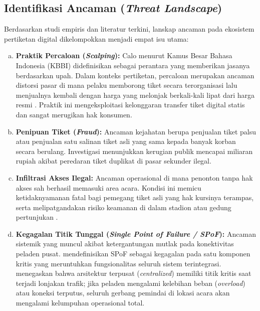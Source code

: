 \subsection{Identifikasi Ancaman (\textit{Threat Landscape})}
Berdasarkan studi empiris dan literatur terkini, lanskap ancaman pada ekosistem pertiketan digital dikelompokkan menjadi empat isu utama:

\begin{enumerate}[a)]
    \item \textbf{Praktik Percaloan (\textit{Scalping}): }
    Calo menurut Kamus Besar Bahasa Indonesia (KBBI) didefinisikan sebagai perantara yang memberikan jasanya berdasarkan upah. Dalam konteks pertiketan, percaloan merupakan ancaman distorsi pasar di mana pelaku memborong tiket secara terorganisasi lalu menjualnya kembali dengan harga yang melonjak berkali-kali lipat dari harga resmi \cite{Pamela2023}. Praktik ini mengeksploitasi kelonggaran transfer tiket digital statis dan sangat merugikan hak konsumen.
        
    \item \textbf{Penipuan Tiket (\textit{Fraud}): }
    Ancaman kejahatan berupa penjualan tiket palsu atau penjualan satu salinan tiket asli yang sama kepada banyak korban secara berulang. Investigasi \textcite{diveranta2025jejak} menunjukkan kerugian publik mencapai miliaran rupiah akibat peredaran tiket duplikat di pasar sekunder ilegal.

    \item \textbf{Infiltrasi Akses Ilegal: }
    Ancaman operasional di mana penonton tanpa hak akses sah berhasil memasuki area acara. Kondisi ini memicu ketidaknyamanan fatal bagi pemegang tiket asli yang hak kursinya terampas, serta melipatgandakan risiko keamanan di dalam stadion atau gedung pertunjukan \cite{Kurniawan2024}.

    \item \textbf{Kegagalan Titik Tunggal (\textit{Single Point of Failure / SPoF}): }
    Ancaman sistemik yang muncul akibat ketergantungan mutlak pada konektivitas peladen pusat. \textcite{lever2013single} mendefinisikan SPoF sebagai kegagalan pada satu komponen kritis yang meruntuhkan fungsionalitas seluruh sistem terintegrasi. \textcite{jafarnejad2017load} menegaskan bahwa arsitektur terpusat (\textit{centralized}) memiliki titik kritis saat terjadi lonjakan trafik; jika peladen mengalami kelebihan beban (\textit{overload}) atau koneksi terputus, seluruh gerbang pemindai di lokasi acara akan mengalami kelumpuhan operasional total.
\end{enumerate}

